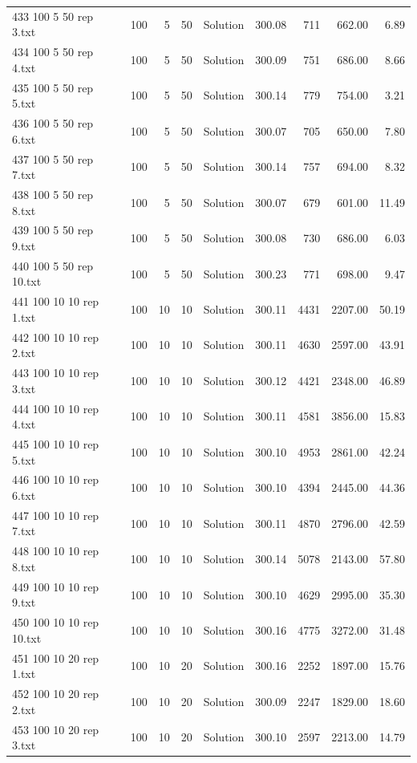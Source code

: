 \begin{longtable}{lrrllrrrr}
433 100 5 50 rep 3.txt & 100 & 5 & 50 & Solution & 300.08 & 711 & 662.00 &  6.89\\
434 100 5 50 rep 4.txt & 100 & 5 & 50 & Solution & 300.09 & 751 & 686.00 &  8.66\\
435 100 5 50 rep 5.txt & 100 & 5 & 50 & Solution & 300.14 & 779 & 754.00 &  3.21\\
436 100 5 50 rep 6.txt & 100 & 5 & 50 & Solution & 300.07 & 705 & 650.00 &  7.80\\
437 100 5 50 rep 7.txt & 100 & 5 & 50 & Solution & 300.14 & 757 & 694.00 &  8.32\\
438 100 5 50 rep 8.txt & 100 & 5 & 50 & Solution & 300.07 & 679 & 601.00 & 11.49\\
439 100 5 50 rep 9.txt & 100 & 5 & 50 & Solution & 300.08 & 730 & 686.00 &  6.03\\
440 100 5 50 rep 10.txt & 100 & 5 & 50 & Solution & 300.23 & 771 & 698.00 &  9.47\\
441 100 10 10 rep 1.txt & 100 & 10 & 10 & Solution & 300.11 & 4431 & 2207.00 & 50.19\\
442 100 10 10 rep 2.txt & 100 & 10 & 10 & Solution & 300.11 & 4630 & 2597.00 & 43.91\\
443 100 10 10 rep 3.txt & 100 & 10 & 10 & Solution & 300.12 & 4421 & 2348.00 & 46.89\\
444 100 10 10 rep 4.txt & 100 & 10 & 10 & Solution & 300.11 & 4581 & 3856.00 & 15.83\\
445 100 10 10 rep 5.txt & 100 & 10 & 10 & Solution & 300.10 & 4953 & 2861.00 & 42.24\\
446 100 10 10 rep 6.txt & 100 & 10 & 10 & Solution & 300.10 & 4394 & 2445.00 & 44.36\\
447 100 10 10 rep 7.txt & 100 & 10 & 10 & Solution & 300.11 & 4870 & 2796.00 & 42.59\\
448 100 10 10 rep 8.txt & 100 & 10 & 10 & Solution & 300.14 & 5078 & 2143.00 & 57.80\\
449 100 10 10 rep 9.txt & 100 & 10 & 10 & Solution & 300.10 & 4629 & 2995.00 & 35.30\\
450 100 10 10 rep 10.txt & 100 & 10 & 10 & Solution & 300.16 & 4775 & 3272.00 & 31.48\\
451 100 10 20 rep 1.txt & 100 & 10 & 20 & Solution & 300.16 & 2252 & 1897.00 & 15.76\\
452 100 10 20 rep 2.txt & 100 & 10 & 20 & Solution & 300.09 & 2247 & 1829.00 & 18.60\\
453 100 10 20 rep 3.txt & 100 & 10 & 20 & Solution & 300.10 & 2597 & 2213.00 & 14.79\\

\end{longtable}

